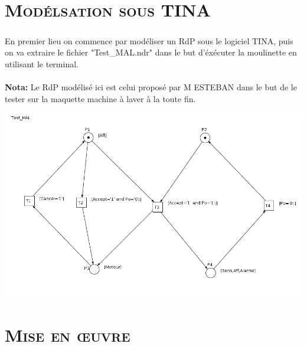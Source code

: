 \chapter{\textsc{Modélsation sous TINA}}

\paragraph{} En premier lieu on commence par modéliser un RdP sous le logiciel TINA, puis on va extraire le fichier "Test\_MAL.ndr" dans le but d'éxécuter la moulinette en utilisant le terminal.\\\\
\textbf{Nota: } Le RdP modélisé ici est celui proposé par M ESTEBAN dans le but de le tester sur la maquette machine à laver à la toute fin.

	\begin{center}
	\includegraphics[scale=0.5]{Test_MAL.png}
	\label{fig1} 
	\end{center}	   

\chapter{\textsc{Mise en œuvre}}	
